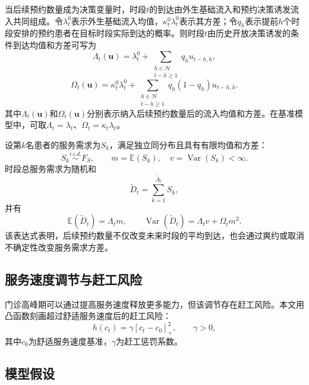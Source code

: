 \documentclass[a4paper,zihao=-4]{ctexart}
\newcommand{\E}{\mathbb{E}}
\newcommand{\Var}{\operatorname{Var}}
\numberwithin{figure}{section}
\numberwithin{table}{section}
\begin{document}
当后续预约数量成为决策变量时，时段$t$的到达由外生基础流入和预约决策诱发流入共同组成。令$\lambda_t^0$表示外生基础流入均值，$\kappa_t^0\lambda_t^0$表示其方差；令$q_h$表示提前$h$个时段安排的预约患者在目标时段实际到达的概率。则时段$t$由历史开放决策诱发的条件到达均值和方差可写为
\begin{equation}
\Lambda_t(\bm u)=\lambda_t^0+\sum_{\substack{h\in\mathcal H\\ t-h\geq 1}}q_hu_{t-h,h},
\label{eq:arrival-mean-with-booking}
\end{equation}
\begin{equation}
\Omega_t(\bm u)=\kappa_t^0\lambda_t^0+
\sum_{\substack{h\in\mathcal H\\ t-h\geq 1}}q_h(1-q_h)u_{t-h,h}.
\label{eq:arrival-var-with-booking}
\end{equation}
其中$\Lambda_t(\bm u)$和$\Omega_t(\bm u)$分别表示纳入后续预约数量后的流入均值和方差。在基准模型中，可取$\Lambda_t=\lambda_t$、$\Omega_t=\kappa_t\lambda_t$。

设第$k$名患者的服务需求为$S_k$，满足独立同分布且具有有限均值和方差：
\begin{equation}
S_k\overset{i.i.d.}{\sim}F_S,\qquad m=\E(S_k),\quad v=\Var(S_k)<\infty .
\end{equation}
时段总服务需求为随机和
\begin{equation}
\tilde D_t=\sum_{k=1}^{\tilde A_t}S_k,
\end{equation}
并有
\begin{equation}
\E(\tilde D_t)=\Lambda_t m,\qquad
\Var(\tilde D_t)=\Lambda_t v+\Omega_t m^2 .
\label{eq:compound-moments}
\end{equation}
该表达式表明，后续预约数量不仅改变未来时段的平均到达，也会通过爽约或取消不确定性改变服务需求方差。

\subsection{服务速度调节与赶工风险}

门诊高峰期可以通过提高服务速度释放更多能力，但该调节存在赶工风险。本文用凸函数刻画超过舒适服务速度后的赶工风险：
\begin{equation}
h(c_t)=\gamma[c_t-c_0]_+^2,\qquad \gamma>0,
\label{eq:rushing-penalty}
\end{equation}
其中$c_0$为舒适服务速度基准，$\gamma$为赶工惩罚系数。

\subsection{模型假设}
\end{document}
